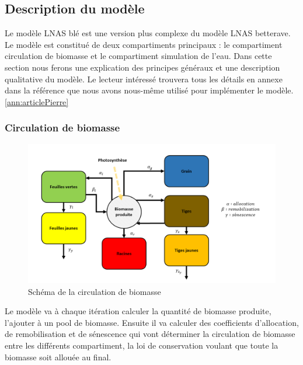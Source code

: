 \subsection{Description du modèle}

Le modèle LNAS blé est une version plus complexe du modèle LNAS betterave. Le modèle est constitué de deux compartiments principaux : le compartiment circulation de biomasse et le compartiment simulation de l'eau. Dans cette section nous ferons une explication des principes généraux et une description qualitative du modèle. Le lecteur intéressé trouvera tous les détails en annexe dans  la référence que nous avons nous-même utilisé pour implémenter le modèle. \ref{ann:articlePierre}

\subsubsection{Circulation de biomasse}

\begin{figure}

\begin{center}
 \includegraphics[scale = 0.5]{./img/modelSchema.png}
 \caption{Schéma de la circulation de biomasse}
 \label{fig:schemaModel}
\end{center}

\end{figure}

Le modèle va à chaque itération calculer la quantité de biomasse produite, l'ajouter à un pool de biomasse. Ensuite il va calculer des coefficients d'allocation, de remobilisation et de sénescence qui vont déterminer la circulation de biomasse entre les différents compartiment, la loi de conservation voulant que toute la biomasse soit allouée au final.

